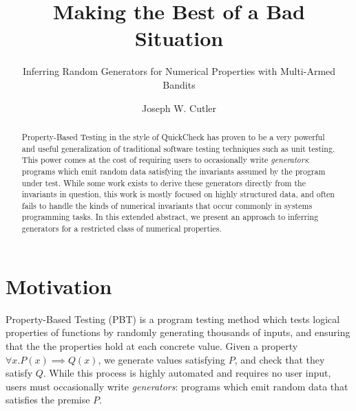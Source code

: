 \documentclass[sigconf,nonacm]{acmart}
\begin{document}
\title{Making the Best of a Bad Situation}
\subtitle{Inferring Random Generators for Numerical Properties with Multi-Armed Bandits}

\author{Joseph W. Cutler}

\renewcommand{\shortauthors}{Cutler}

\begin{abstract}
  Property-Based Testing in the style of QuickCheck has proven to be a
  very powerful and useful generalization of traditional software testing techniques
  such as unit testing. This power comes at the cost of requiring users to occasionally write \emph{generators}:
  programs which emit random data satisfying the invariants assumed by the program under test. While some work exists
  to derive these generators directly from the invariants in question, this work is mostly focused on highly structured data,
  and often fails to handle the kinds of numerical invariants that occur commonly in systems programming tasks.
  In this extended abstract, we present an approach to inferring generators for a restricted class of numerical properties.
  \vspace{-18px}
\end{abstract}


\maketitle

\section{Motivation}
Property-Based Testing (PBT) \cite{qc} is a program testing method which tests
logical properties of functions by randomly generating thousands of inputs, and ensuring that
the the properties hold at each concrete value. Given a property $\forall x. P(x) \implies Q(x)$,
we generate values satisfying $P$, and check that they satisfy $Q$.
While this process is highly automated and requires no user input, users must occasionally write \emph{generators}:
programs which emit random data that satisfies the premise $P$.
\end{document}
